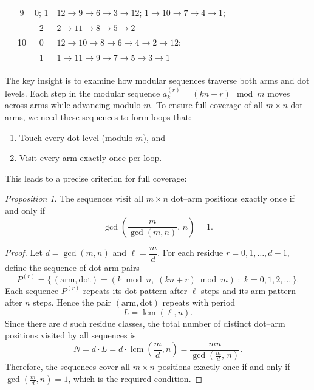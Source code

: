 \documentclass[12pt,a4paper]{article}
\theoremstyle{remark} %
\theoremstyle{example} %
\theoremstyle{proposition}
\newtheorem{proposition}{Proposition}
\begin{document}
\begin{longtable}{|c|c|c|l|}
& 9 & 0; 1 & $12 \rightarrow 9 \rightarrow 6 \rightarrow 3 \rightarrow 12$; $1 \rightarrow 10 \rightarrow 7 \rightarrow 4 \rightarrow 1$; \\
 &  & 2 & $2 \rightarrow 11 \rightarrow 8 \rightarrow 5 \rightarrow 2$ \\
& 10 & 0 & $12 \rightarrow 10 \rightarrow 8 \rightarrow 6 \rightarrow 4 \rightarrow 2 \rightarrow 12$; \\
 &  & 1 & $1 \rightarrow 11 \rightarrow 9 \rightarrow 7 \rightarrow 5 \rightarrow 3 \rightarrow 1$ \\
\midrule
\end{longtable}




\noindent
The key insight is to examine how modular sequences traverse both arms and dot levels. Each step in the modular sequence \( a_k^{(r)} = (kn + r) \mod m \) moves across arms while advancing modulo \( m \). To ensure full coverage of all \( m \times n \) dot-arms, we need these sequences to form loops that:
\begin{enumerate}
    \item Touch every dot level (modulo \( m \)), and
    \item Visit every arm exactly once per loop.
\end{enumerate}
    
This leads to a precise criterion for full coverage:

\begin{proposition}
The sequences visit all \( m \times n \) dot--arm positions exactly once if and only if
\[
\gcd\!\left(\frac{m}{\gcd(m,n)},\,n\right)=1.
\]
\end{proposition}

\begin{proof}
Let \( d=\gcd(m,n) \) and \( \ell=\dfrac{m}{d} \).  
For each residue \( r=0,1,\dots,d-1 \), define the sequence of dot-arm pairs
\[
P^{(r)}=\Big\{\,(\text{arm},\text{dot})=(k\bmod n,\; (kn+r)\bmod m)\;:\;k=0,1,2,\dots\,\Big\}.
\]
Each sequence \(P^{(r)}\) repeats its dot pattern after \(\ell\) steps
and its arm pattern after \(n\) steps.  
Hence the pair \((\text{arm},\text{dot})\) repeats with period
\[
L=\operatorname{lcm}(\ell,n).
\]
Since there are \(d\) such residue classes, the total number of distinct
dot--arm positions visited by all sequences is
\[
N=d\cdot L
   =d\cdot\operatorname{lcm}\!\left(\frac{m}{d},n\right)
   =\frac{mn}{\gcd(\frac{m}{d},\,n)}.
\]
Therefore, the sequences cover all \(m\times n\) positions exactly once
if and only if \(\gcd(\frac{m}{d},n)=1\), which is the required condition.
\end{proof}
\end{document}

